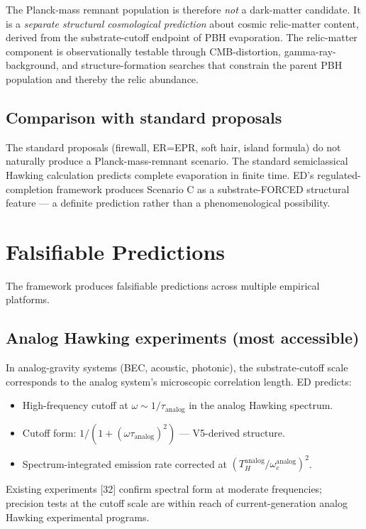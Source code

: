 \documentclass[11pt,a4paper]{article}
\begin{document}
The Planck-mass remnant population is therefore \emph{not} a dark-matter candidate. It is a \emph{separate structural cosmological prediction} about cosmic relic-matter content, derived from the substrate-cutoff endpoint of PBH evaporation. The relic-matter component is observationally testable through CMB-distortion, gamma-ray-background, and structure-formation searches that constrain the parent PBH population and thereby the relic abundance.

\subsection*{Comparison with standard proposals}

The standard proposals (firewall, ER=EPR, soft hair, island formula) do not naturally produce a Planck-mass-remnant scenario. The standard semiclassical Hawking calculation predicts complete evaporation in finite time. ED's regulated-completion framework produces Scenario C as a substrate-FORCED structural feature --- a definite prediction rather than a phenomenological possibility.

\section{Falsifiable Predictions}

The framework produces falsifiable predictions across multiple empirical platforms.

\subsection{Analog Hawking experiments (most accessible)}

In analog-gravity systems (BEC, acoustic, photonic), the substrate-cutoff scale corresponds to the analog system's microscopic correlation length. ED predicts:
\begin{itemize}[noitemsep]
  \item High-frequency cutoff at $\omega \sim 1/\tau_{\mathrm{analog}}$ in the analog Hawking spectrum.
  \item Cutoff form: $1/(1 + (\omega\tau_{\mathrm{analog}})^2)$ --- V5-derived structure.
  \item Spectrum-integrated emission rate corrected at $(T_H^{\mathrm{analog}}/\omega_c^{\mathrm{analog}})^2$.
\end{itemize}

Existing experiments [32] confirm spectral form at moderate frequencies; precision tests at the cutoff scale are within reach of current-generation analog Hawking experimental programs.
\end{document}
